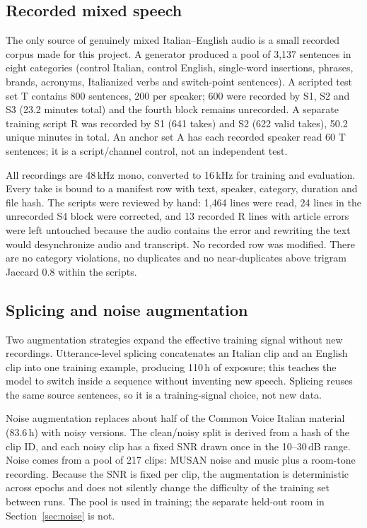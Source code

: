 \documentclass{article}
\begin{document}
\subsection{Recorded mixed speech}

The only source of genuinely mixed Italian--English audio is a small recorded corpus made for this
project. A generator produced a pool of 3{,}137 sentences in eight categories (control Italian,
control English, single-word insertions, phrases, brands, acronyms, Italianized verbs and
switch-point sentences). A scripted test set T contains 800 sentences, 200 per speaker; 600 were
recorded by S1, S2 and S3 (23.2 minutes total) and the fourth block remains unrecorded. A
separate training script R was recorded by S1 (641 takes) and S2 (622 valid takes), 50.2 unique
minutes in total. An anchor set A has each recorded speaker read 60 T sentences; it is a
script/channel control, not an independent test.

All recordings are 48\,kHz mono, converted to 16\,kHz for training and evaluation. Every take is
bound to a manifest row with text, speaker, category, duration and file hash. The scripts were
reviewed by hand: 1{,}464 lines were read, 24 lines in the unrecorded S4 block were corrected, and
13 recorded R lines with article errors were left untouched because the audio contains the error
and rewriting the text would desynchronize audio and transcript. No recorded row was modified.
There are no category violations, no duplicates and no near-duplicates above trigram Jaccard 0.8
within the scripts.

\subsection{Splicing and noise augmentation}

Two augmentation strategies expand the effective training signal without new recordings.
Utterance-level splicing concatenates an Italian clip and an English clip into one training
example, producing 110\,h of exposure; this teaches the model to switch inside a sequence without
inventing new speech. Splicing reuses the same source sentences, so it is a training-signal
choice, not new data.

Noise augmentation replaces about half of the Common Voice Italian material (83.6\,h) with noisy
versions. The clean/noisy split is derived from a hash of the clip ID, and each noisy clip has a
fixed SNR drawn once in the 10--30\,dB range. Noise comes from a pool of 217 clips: MUSAN noise and
music \citep{snyder2015musan} plus a room-tone recording. Because the SNR is fixed per clip, the
augmentation is deterministic across epochs and does not silently change the difficulty of the
training set between runs. The pool is used in training; the separate held-out room in
Section~\ref{sec:noise} is not.
\end{document}
